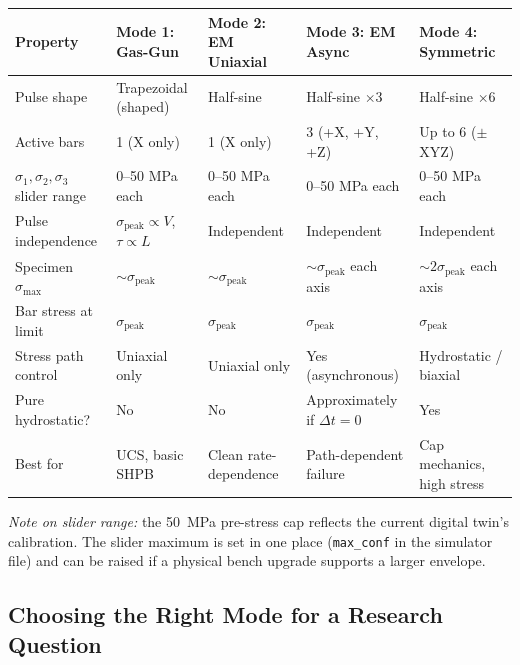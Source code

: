 \documentclass[11pt,a4paper]{article}
\providecommand{\SI}[2]{\qty{#1}{#2}}
\newcommand{\sig}{\sigma}
\newcommand{\sigpeak}{\sig_{\text{peak}}}
\begin{document}
\begin{center}
\renewcommand{\arraystretch}{1.5}
\small
\begin{tabular}{@{}p{3.6cm}p{2.6cm}p{2.6cm}p{2.6cm}p{2.6cm}@{}}
\toprule
\textbf{Property} & \textbf{Mode 1: Gas-Gun} & \textbf{Mode 2: EM Uniaxial} & \textbf{Mode 3: EM Async} & \textbf{Mode 4: Symmetric} \\
\midrule
Pulse shape & Trapezoidal (shaped) & Half-sine & Half-sine $\times 3$ & Half-sine $\times 6$ \\
Active bars & 1 (X only) & 1 (X only) & 3 (+X, +Y, +Z) & Up to 6 ($\pm$XYZ) \\
$\sig_1, \sig_2, \sig_3$ slider range & 0--50 MPa each & 0--50 MPa each & 0--50 MPa each & 0--50 MPa each \\
Pulse independence & $\sigpeak \propto V$, $\tau \propto L$ & Independent & Independent & Independent \\
Specimen $\sig_{\max}$ & $\sim \sigpeak$ & $\sim \sigpeak$ & $\sim \sigpeak$ each axis & $\sim 2\sigpeak$ each axis \\
Bar stress at limit & $\sigpeak$ & $\sigpeak$ & $\sigpeak$ & $\sigpeak$ \\
Stress path control & Uniaxial only & Uniaxial only & Yes (asynchronous) & Hydrostatic / biaxial \\
Pure hydrostatic? & No & No & Approximately if $\Delta t = 0$ & Yes \\
Best for & UCS, basic SHPB & Clean rate-dependence & Path-dependent failure & Cap mechanics, high stress \\
\bottomrule
\end{tabular}
\end{center}

\noindent\textit{Note on slider range:} the \SI{50}{MPa} pre-stress cap reflects
the current digital twin's calibration. The slider maximum is set in one place
(\texttt{max\_conf} in the simulator file) and can be raised if a physical bench
upgrade supports a larger envelope.

\subsection{Choosing the Right Mode for a Research Question}
\end{document}
